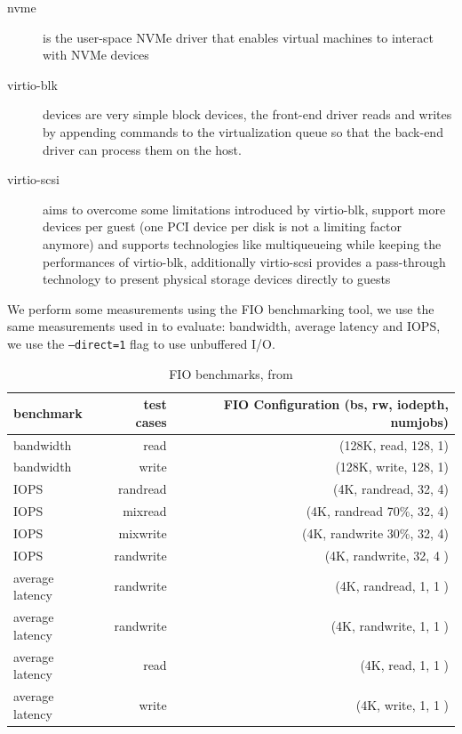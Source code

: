 \documentclass[twocolumn]{article}
\begin{document}
    \begin{description}
        \item[nvme] is the user-space NVMe driver that enables virtual machines to interact with NVMe devices
        \item[virtio-blk] devices are very simple block devices, the front-end driver reads and writes by appending commands to the virtualization queue so that the back-end driver can process them on the host.
        \item[virtio-scsi] aims to overcome some limitations introduced by virtio-blk, support more devices per guest (one PCI device per disk is not a limiting factor anymore) and supports technologies like multiqueueing while keeping the performances of virtio-blk, additionally virtio-scsi provides a pass-through technology to present physical storage devices directly to guests
    \end{description}

    We perform some measurements using the FIO \cite{fio} benchmarking tool, we use the same measurements used in \cite{spool} to evaluate: bandwidth, average latency and IOPS, we use the \texttt{--direct=1} flag to use unbuffered I/O.
    \begin{table}
        \centering
        \label{tab:fio-benchmarks}
        \begin{tabular}{l|r|r}
        \hline
        \textbf{benchmark} & \textbf{test cases} & \textbf{FIO Configuration (bs, rw, iodepth, numjobs)} \\
        \hline
        bandwidth          &  read               & (128K, read, 128, 1)                                  \\
        bandwidth          & write               & (128K, write, 128, 1)                                 \\
        IOPS               &  randread           &(4K, randread, 32, 4)                                  \\
        IOPS               & mixread             & (4K, randread 70\%, 32, 4)                            \\
        IOPS               &  mixwrite           & (4K, randwrite 30\%, 32, 4)                           \\
        IOPS               &  randwrite          &  (4K, randwrite, 32, 4 )                              \\
        average latency    &  randwrite          & (4K, randread, 1, 1 )                                 \\
        average latency    &  randwrite          & (4K, randwrite, 1, 1 )                                \\
        average latency    &  read               &(4K, read, 1, 1 )                                      \\
        average latency    &  write	             & (4K, write, 1, 1 )                                    \\
        \end{tabular}
        \caption{FIO benchmarks, from \cite{spool}} 
    \end{table}
\end{document}
